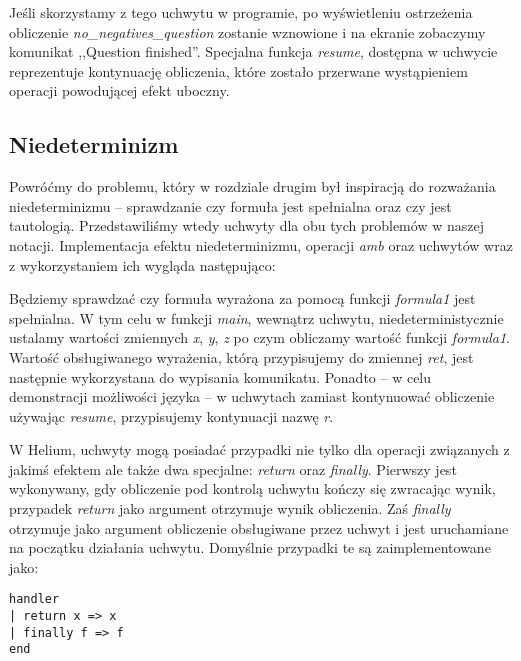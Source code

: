 

Jeśli skorzystamy z tego uchwytu w programie, po wyświetleniu ostrzeżenia obliczenie \textit{no\_negatives\_question} zostanie wznowione i na ekranie zobaczymy komunikat ,,Question finished''. Specjalna funkcja \textit{resume}, dostępna w uchwycie reprezentuje kontynuację obliczenia, które zostało przerwane wystąpieniem operacji powodującej efekt uboczny.

\subsection{Niedeterminizm}

Powróćmy do problemu, który w rozdziale drugim był inspiracją do rozważania niedeterminizmu -- sprawdzanie czy formuła jest spełnialna oraz czy jest tautologią. Przedstawiliśmy wtedy uchwyty dla obu tych problemów w naszej notacji. Implementacja efektu niedeterminizmu, operacji \textit{amb} oraz uchwytów wraz z wykorzystaniem ich wygląda następująco:



Będziemy sprawdzać czy formuła wyrażona za pomocą funkcji \textit{formula1} jest spełnialna. W tym celu w funkcji \textit{main}, wewnątrz uchwytu, niedeterministycznie ustalamy wartości zmiennych \textit{x}, \textit{y}, \textit{z} po czym obliczamy wartość funkcji \textit{formula1}. Wartość obsługiwanego wyrażenia, którą przypisujemy do zmiennej \textit{ret}, jest następnie wykorzystana do wypisania komunikatu. Ponadto -- w celu demonstracji możliwości języka -- w uchwytach zamiast kontynuować obliczenie używając \textit{resume}, przypisujemy kontynuacji nazwę \textit{r}.

W Helium, uchwyty mogą posiadać przypadki nie tylko dla operacji związanych z jakimś efektem ale także dwa specjalne: \textit{return} oraz \textit{finally}. Pierwszy jest wykonywany, gdy obliczenie pod kontrolą uchwytu kończy się zwracając wynik, przypadek \textit{return} jako argument otrzymuje wynik obliczenia. Zaś \textit{finally} otrzymuje jako argument obliczenie obsługiwane przez uchwyt i jest uruchamiane na początku działania uchwytu. Domyślnie przypadki te są zaimplementowane jako:

\begin{lstlisting}
handler
| return x => x
| finally f => f
end
\end{lstlisting}

